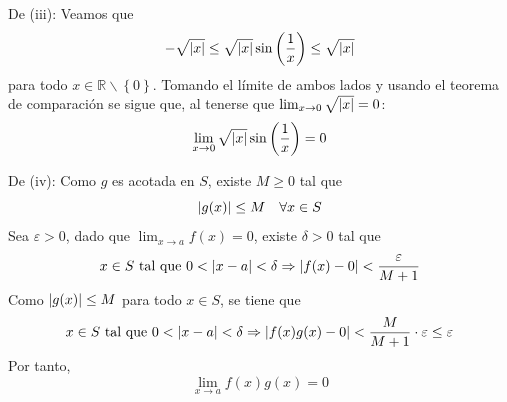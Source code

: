 \documentclass[12pt]{article}
\begin{document}
\begin{enumerate}
\begin{sol}
        De (iii): Veamos que
        \begin{equation*}
            -\sqrt{\left| x \right|}\leq\sqrt{\left| x \right|}\sin\left(\frac{1}{x}\right)\leq\sqrt{\left| x \right|}
        \end{equation*}
        para todo $x\in\mathbb{R}\backslash\left\{0\right\}$. Tomando el límite de ambos lados y usando el teorema de comparación se sigue que, al tenerse que $\lim_{ x\rightarrow 0}\sqrt{\left| x \right|}=0$:
        \begin{equation*}
            \lim_{x\rightarrow0}\sqrt{\left| x \right|}\sin\left(\frac{1}{x} \right)=0
        \end{equation*}

        De (iv): Como $g$ es acotada en $S$, existe $M\geq0$ tal que
        \begin{equation*}
            \left| g(x) \right|\leq M\quad\forall x\in S
        \end{equation*}
        Sea $\varepsilon>0$, dado que $\lim_{ x\rightarrow a}f(x)=0$, existe $\delta>0$ tal que
        \begin{equation*}
            x\in S\textup{ tal que }0<\left| x-a \right|<\delta\Rightarrow\left| f(x)-0 \right|<\frac{\varepsilon}{M+1}
        \end{equation*}
        Como $\left| g(x) \right|\leq M$ para todo $x\in S$, se tiene que
        \begin{equation*}
            x\in S\textup{ tal que }0<\left| x-a \right|<\delta\Rightarrow\left| f(x)g(x)-0 \right|<\frac{M}{M+1}\cdot\varepsilon\leq\varepsilon
        \end{equation*}
        Por tanto,
        \begin{equation*}
            \lim_{ x\rightarrow a}f(x)g(x)=0
        \end{equation*}
    \end{sol}


\end{enumerate}
\end{document}
